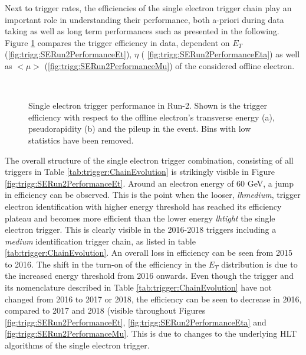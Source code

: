 Next to trigger rates,  the efficiencies of the single electron trigger chain play an important role in understanding their performance,  both a-priori during data taking as well as long term performances such as presented in the following.  Figure \ref{fig:trigg:SERun2Performance} compares the trigger efficiency in data,  dependent on $E_T$ (\ref{fig:trigg:SERun2PerformanceEt}),  $\eta$ ( \ref{fig:trigg:SERun2PerformanceEta}) as well as $<\mu>$ (\ref{fig:trigg:SERun2PerformanceMu}) of the considered offline electron. 
\begin{figure}[h]
    \centering
  \\
  \caption{Single electron trigger performance in Run-2\label{fig:trigg:SERun2Performance}.  Shown is the trigger efficiency with respect to the offline electron's transverse energy (a),  pseudorapidity (b) and the pileup in the event. Bins with low statistics have been removed.}
\end{figure}
The overall structure of the single electron trigger combination, consisting of all triggers in Table \ref{tab:trigger:ChainEvolution} is strikingly visible in Figure \ref{fig:trigg:SERun2PerformanceEt}.  Around an electron energy of 60 GeV, a jump in efficiency can be observed.  This is the point when the looser, \textit{lhmedium},  trigger electron identification with higher energy threshold has reached its efficiency plateau and becomes more efficient than the lower energy \textit{lhtight} the single electron trigger. 
This is clearly visible in the 2016-2018 triggers including a \textit{medium} identification trigger chain, as listed in table \ref{tab:trigger:ChainEvolution}.  An overall loss in efficiency can be seen from 2015 to 2016.  The shift in the turn-on of the efficiency in the $E_T$ distribution is due to the increased energy threshold from 2016 onwards.
Even though the trigger and its nomenclature described in Table \ref{tab:trigger:ChainEvolution} have not changed  from 2016 to 2017 or 2018,  the efficiency can be seen to decrease in 2016,  compared to 2017 and 2018 (visible throughout Figures \ref{fig:trigg:SERun2PerformanceEt},  \ref{fig:trigg:SERun2PerformanceEta} and \ref{fig:trigg:SERun2PerformanceMu}. This is due to changes to the underlying \ac{HLT} algorithms of the single electron trigger.
